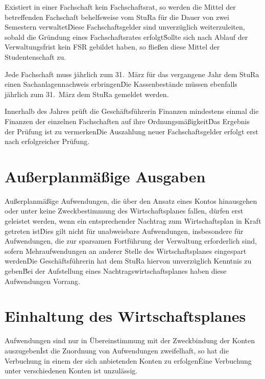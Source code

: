 {\begin{multicols}{2}
\Abs \Satz Existiert in einer Fachschaft kein Fachschaftsrat, so werden die Mittel der betreffenden Fachschaft behelfsweise vom StuRa für die Dauer von zwei Semestern verwaltet\. Diese Fachschaftsgelder sind unverzüglich weiterzuleiten, sobald die Gründung eines Fachschaftsrates erfolgt\. Sollte sich nach Ablauf der Verwaltungsfrist kein FSR gebildet haben, so fließen diese Mittel der Studentenschaft zu.

\Abs \Satz Jede Fachschaft muss jährlich zum 31.~März für das vergangene Jahr dem StuRa einen Sachanlagennachweis erbringen\. Die Kassenbestände müssen ebenfalls jährlich zum 31.~März dem StuRa gemeldet werden.

\Abs \Satz Innerhalb des Jahres prüft die Geschäftsführerin Finanzen mindestens einmal die Finanzen der einzelnen Fachschaften auf ihre Ordnungsmäßigkeit\. Das Ergebnis der Prüfung ist zu vermerken\. Die Auszahlung neuer Fachschaftsgelder erfolgt erst nach erfolgreicher Prüfung.



\section{Außerplanmäßige Ausgaben}

\Abs \Satz Außerplanmäßige Aufwendungen, die über den Ansatz eines Kontos hinausgehen oder unter keine Zweckbestimmung des Wirtschaftsplanes fallen, dürfen erst geleistet werden, wenn ein entsprechender Nachtrag zum Wirtschaftsplan in Kraft getreten ist\. Dies gilt nicht für unabweisbare Aufwendungen, insbesondere für Aufwendungen, die zur sparsamen Fortführung der Verwaltung erforderlich sind, sofern Mehraufwendungen an anderer Stelle des Wirtschaftsplanes eingespart werden\. Die Geschäftsführerin hat dem StuRa hiervon unverzüglich Kenntnis zu geben\. Bei der Aufstellung eines Nachtragswirtschaftsplanes haben diese Aufwendungen Vorrang.



\section{Einhaltung des Wirtschaftsplanes}

\Abs \Satz Aufwendungen sind nur in Übereinstimmung mit der Zweckbindung der Konten auszugeben\. Ist die Zuordnung von Aufwendungen zweifelhaft, so hat die Verbuchung in einem der sich anbietenden Konten zu erfolgen\. Eine Verbuchung unter verschiedenen Konten ist unzulässig.




\end{multicols}}
